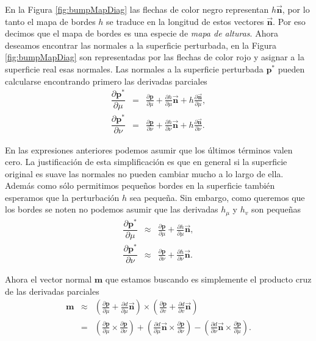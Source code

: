 En la Figura \ref{fig:bumpMapDiag} las flechas de color negro representan $h \vec{\textbf{n}}$, por lo tanto el mapa de bordes $h$ se traduce en la longitud de estos vectores $\vec{\textbf{n}}$. Por eso decimos que el mapa de bordes es una especie de \emph{mapa de alturas}. Ahora deseamos encontrar las normales a la superficie perturbada, en la Figura \ref{fig:bumpMapDiag} son representadas por las flechas de color rojo y asignar a la superficie real esas normales. Las normales a la superficie perturbada $\textbf{p}^{*}$ pueden calcularse encontrando primero las derivadas parciales
\begin{eqnarray}
\nonumber
\dfrac{\partial \textbf{p}^{*}}{\partial \mu} & = & \frac{\partial \textbf{p}}{\partial \mu} + \frac{\partial h}{\partial \mu} \vec{\textbf{n}} + h \frac{\partial \vec{\textbf{n}}}{\partial \mu}, \\
\dfrac{\partial \textbf{p}^{*}}{\partial \nu} & = & \frac{\partial \textbf{p}}{\partial \nu} + \frac{\partial h}{\partial \nu} \vec{\textbf{n}} + h \frac{\partial \vec{\textbf{n}}}{\partial \nu}.
\end{eqnarray}

En las expresiones anteriores podemos asumir que los últimos términos valen cero. La justificación de esta simplificación es que en general si la superficie original es suave las normales no pueden cambiar mucho a lo largo de ella. Además como sólo permitimos pequeños bordes en la superficie también esperamos que la perturbación $h$ sea pequeña. Sin embargo, como queremos que los bordes se noten no podemos asumir que las derivadas $h_\mu$ y $h_v$ son pequeñas
\begin{eqnarray}
\nonumber
\dfrac{\partial \textbf{p}^{*}}{\partial \mu} & \approx & \frac{\partial \textbf{p}}{\partial \mu} + \frac{\partial h}{\partial \mu} \vec{\textbf{n}}, \\
\dfrac{\partial \textbf{p}^{*}}{\partial \nu} & \approx & \frac{\partial \textbf{p}}{\partial \nu} + \frac{\partial h}{\partial \nu} \vec{\textbf{n}}.
\end{eqnarray}

Ahora el vector normal $\textbf{m}$ que estamos buscando es simplemente el producto cruz de las derivadas parciales
\begin{eqnarray}
\nonumber
\textbf{m}  & \approx & \left( \frac{\partial \textbf{p}}{\partial \mu} + \frac{\partial d}{\partial \mu} \vec{\textbf{n}} \right) \times \left( \frac{\partial \textbf{p}}{\partial v} + \frac{\partial d}{\partial v} \vec{\textbf{n}} \right) \\
& = & \left( \frac{\partial \textbf{p}}{\partial \mu} \times \frac{\partial \textbf{p}}{\partial \nu} \right) + \left( \frac{\partial d}{\partial \mu} \vec{\textbf{n}} \times \frac{\partial \textbf{p}}{\partial \nu} \right) - \left( \frac{\partial d}{\partial \nu} \vec{\textbf{n}} \times \frac{\partial \textbf{p}}{\partial \mu} \right).
\label{ec:normBumpMapping}
\end{eqnarray}

